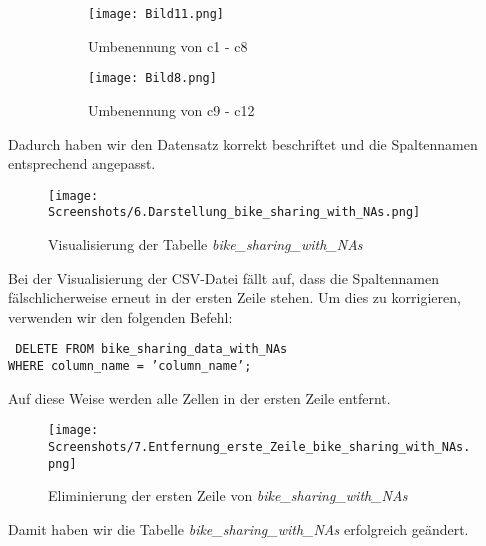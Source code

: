 \documentclass[a4paper, 12pt]{article}
\begin{document}
\begin{figure}[H] 
    \centering
    \begin{subfigure}{0.4\textwidth}
        \centering
        \texttt{[image: Bild11.png]}
         \par \centering Umbenennung von c1 - c8
    \end{subfigure}
    \hfill
    \begin{subfigure}{0.4\textwidth}
        \centering
        \texttt{[image: Bild8.png]}
        \par \centering Umbenennung von c9 - c12
    \end{subfigure}
\end{figure}
{\fontsize{12}{15}\selectfont
\newpage

Dadurch haben wir den Datensatz korrekt beschriftet und die Spaltennamen entsprechend angepasst.

\vspace{\baselineskip}

\begin{figure}[ht]
    \centering
    \texttt{[image: Screenshots/6.Darstellung\_bike\_sharing\_with\_NAs.png]}
    \par Visualisierung der Tabelle \textit{bike\_sharing\_with\_NAs}
\end{figure}

\vspace{\baselineskip}


Bei der Visualisierung der CSV-Datei fällt auf, dass die Spaltennamen fälschlicherweise erneut in der ersten Zeile stehen. Um dies zu korrigieren, verwenden wir den folgenden Befehl:

\vspace{\baselineskip}

{\fontsize{10}{12}\selectfont
\texttt{%
DELETE FROM bike\_sharing\_data\_with\_NAs \\ 
WHERE column\_name = 'column\_name';} 
}

\vspace{\baselineskip}

Auf diese Weise werden alle Zellen in der ersten Zeile entfernt.

\vspace{\baselineskip}

\begin{figure}[ht]
    \centering
    \texttt{[image: Screenshots/7.Entfernung\_erste\_Zeile\_bike\_sharing\_with\_NAs.png]}
    \par Eliminierung der ersten Zeile von \textit{bike\_sharing\_with\_NAs}
\end{figure}


\newpage
Damit haben wir die Tabelle \textit{bike\_sharing\_with\_NAs} erfolgreich geändert.}
\end{document}
